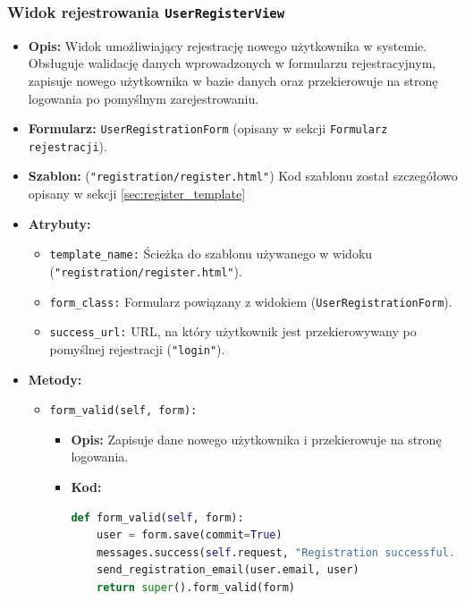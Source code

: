 \documentclass[12pt,a4paper,oneside]{article}
\theoremstyle{definition}
\numberwithin{equation}{section}
\begin{document}
\subsubsection*{Widok rejestrowania \texttt{UserRegisterView}}
\begin{itemize}
    \item \textbf{Opis:}
        Widok umożliwiający rejestrację nowego użytkownika w systemie. Obsługuje walidację danych wprowadzonych w formularzu rejestracyjnym, zapisuje nowego użytkownika w bazie danych oraz przekierowuje na stronę logowania po pomyślnym zarejestrowaniu.
    \item \textbf{Formularz:}
        \texttt{UserRegistrationForm} (opisany w sekcji \texttt{Formularz rejestracji}).
    \item \textbf{Szablon:}
        (\texttt{"registration/register.html"})
        \subsubitem Kod szablonu został szczegółowo opisany w sekcji \ref{sec:register_template}
    \item \textbf{Atrybuty:}
        \begin{itemize}
            \item \texttt{template\_name:} Ścieżka do szablonu używanego w widoku (\texttt{"registration/register.html"}).
            \item \texttt{form\_class:} Formularz powiązany z widokiem (\texttt{UserRegistrationForm}).
            \item \texttt{success\_url:} URL, na który użytkownik jest przekierowywany po pomyślnej rejestracji (\texttt{"login"}).
        \end{itemize}
    \item \textbf{Metody:}
        \begin{itemize}
            \item \texttt{form\_valid(self, form):}
                \begin{itemize}
                    \item \textbf{Opis:} Zapisuje dane nowego użytkownika i przekierowuje na stronę logowania.
                    \item \textbf{Kod:}
                    \begin{lstlisting}[language=Python, caption=Metoda form\_valid w UserRegisterView]
def form_valid(self, form):
    user = form.save(commit=True)
    messages.success(self.request, "Registration successful. Please log in.")
    send_registration_email(user.email, user)
    return super().form_valid(form)
                    \end{lstlisting}
                \end{itemize}
        \end{itemize}
\end{itemize}
\end{document}
